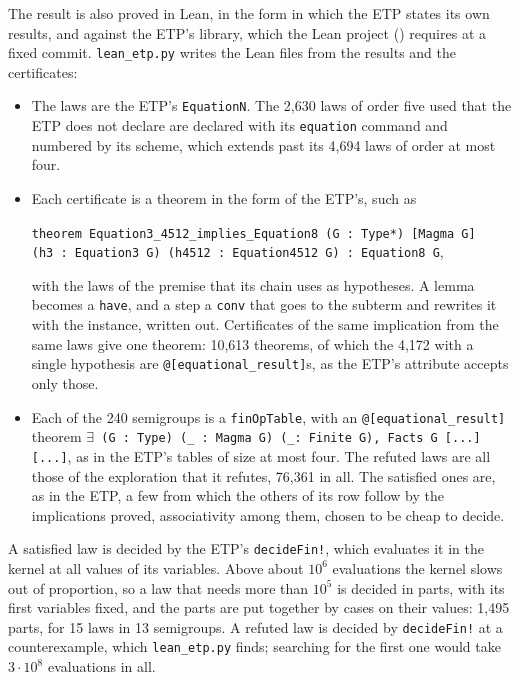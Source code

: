 \documentclass[11pt,a4paper]{article}
\theoremstyle{definition}
\theoremstyle{remark}
\newcommand{\code}[1]{\texttt{#1}}
\begin{document}
The result is also proved in Lean, in the form in which the ETP states its own results, and against the ETP's library, which the Lean project () requires at a fixed commit. \code{lean\_etp.py} writes the Lean files from the results and the certificates:
\begin{itemize}
  \item The laws are the ETP's \code{EquationN}. The 2,630 laws of order five used that the ETP does not declare are declared with its \code{equation} command and numbered by its scheme, which extends past its 4,694 laws of order at most four.
  \item Each certificate is a theorem in the form of the ETP's, such as
\begin{center}
\code{theorem Equation3\_4512\_implies\_Equation8 (G : Type*) [Magma G]}\\
\code{(h3 : Equation3 G) (h4512 : Equation4512 G) : Equation8 G},
\end{center}
with the laws of the premise that its chain uses as hypotheses. A lemma becomes a \code{have}, and a step a \code{conv} that goes to the subterm and rewrites it with the instance, written out. Certificates of the same implication from the same laws give one theorem: 10,613 theorems, of which the 4,172 with a single hypothesis are \code{@[equational\_result]}s, as the ETP's attribute accepts only those.
  \item Each of the 240 semigroups is a \code{finOpTable}, with an \code{@[equational\_result]} theorem \code{\ensuremath{\exists} (G : Type) (\_ : Magma G) (\_: Finite G), Facts G [...] [...]}, as in the ETP's tables of size at most four. The refuted laws are all those of the exploration that it refutes, 76,361 in all. The satisfied ones are, as in the ETP, a few from which the others of its row follow by the implications proved, associativity among them, chosen to be cheap to decide.
\end{itemize}
A satisfied law is decided by the ETP's \code{decideFin!}, which evaluates it in the kernel at all values of its variables. Above about $10^6$ evaluations the kernel slows out of proportion, so a law that needs more than $10^5$ is decided in parts, with its first variables fixed, and the parts are put together by cases on their values: 1,495 parts, for 15 laws in 13 semigroups. A refuted law is decided by \code{decideFin!} at a counterexample, which \code{lean\_etp.py} finds; searching for the first one would take $3 \cdot 10^8$ evaluations in all.
\end{document}
